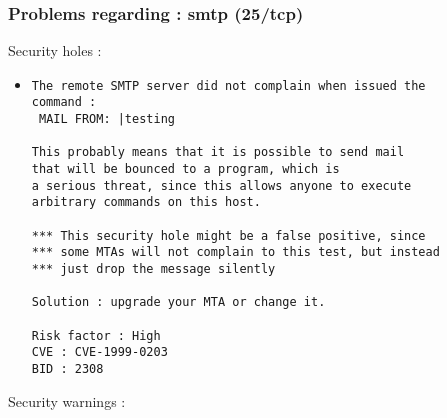 \documentclass{article}
\begin{document}
\subsubsection{Problems regarding : smtp (25/tcp)}
Security holes :\\
\begin{itemize}
\item \begin{verbatim}
The remote SMTP server did not complain when issued the
command :
 MAIL FROM: |testing
 
This probably means that it is possible to send mail 
that will be bounced to a program, which is 
a serious threat, since this allows anyone to execute 
arbitrary commands on this host.

*** This security hole might be a false positive, since
*** some MTAs will not complain to this test, but instead
*** just drop the message silently
   
Solution : upgrade your MTA or change it.

Risk factor : High
CVE : CVE-1999-0203
BID : 2308
\end{verbatim}\end{itemize}
Security warnings :\\
\end{document}
